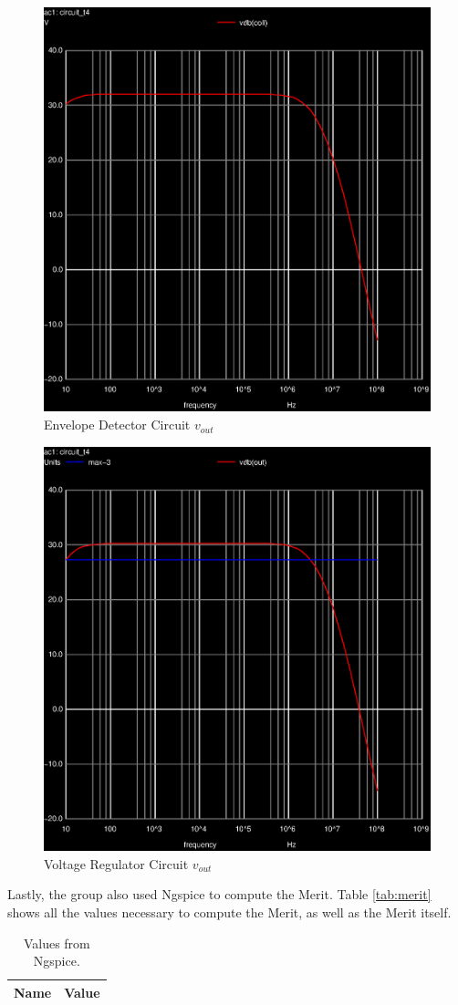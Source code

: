 \begin{figure}[ht]
	\centering
	\includegraphics[width=0.6\linewidth]{vo1f.eps}
	\caption{Envelope Detector Circuit $v_{out}$}
\label{fig:EV_vout}
\end{figure}

\begin{figure}[ht]
	\centering
	\includegraphics[width=0.6\linewidth]{vo2f.eps}
	\caption{Voltage Regulator Circuit $v_{out}$}
\label{fig:VR_vout}
\end{figure}



Lastly, the group also used Ngspice to compute the Merit. Table \ref{tab:merit} shows all the 
values necessary to compute the Merit, as well as the Merit itself.

\begin{table}[h]
	\centering
	\begin{tabular}{|l|r|}
		\hline    
		{\bf Name} & {\bf Value} \\ \hline
    		
	\end{tabular}
	
	\caption{Values from Ngspice.}
    
\label{tab:op_sim}
\end{table}


